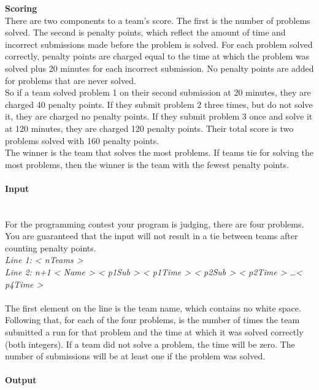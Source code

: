\documentclass{article}
\begin{document}
\textbf{Scoring}\\
There are two components to a team’s score. The first is the number of problems solved. The second is penalty points, which reflect the amount of time and incorrect submissions made before the problem is solved. For each problem solved correctly, penalty points are charged equal to the time
at which the problem was solved plus 20 minutes for each incorrect submission. No penalty points are added for problems that are never solved. \\

So if a team solved problem 1 on their second submission at 20 minutes, they are charged 40 penalty points. If they submit problem 2 three times, but do not solve it, they are charged no penalty points. If they submit problem 3 once and solve it at 120 minutes, they are charged 120 penalty points. Their total score is two problems solved with 160 penalty points. \\

The winner is the team that solves the most problems. If teams tie for solving the most problems, then the winner is the team with the fewest penalty points.


\paragraph{Input} \mbox{} \\

For the programming contest your program is judging, there are four problems. You are guaranteed that the input will not result in a tie between teams after counting penalty points. \\

\textit{Line 1: < nTeams >}\\
\textit{Line 2: n+1 < Name > < p1Sub > < p1Time > < p2Sub > < p2Time > …< p4Time >}\\ \\
The first element on the line is the team name, which contains no white space. Following that,
for each of the four problems, is the number of times the team submitted a run for that problem
and the time at which it was solved correctly (both integers). If a team did not solve a problem,
the time will be zero. The number of submissions will be at least one if the problem was solved.

\paragraph{Output}\mbox{} \\
\end{document}
